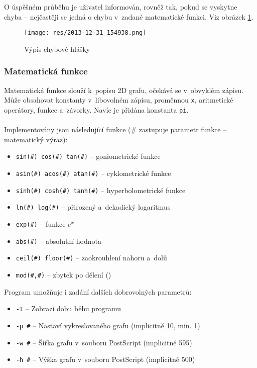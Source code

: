 \documentclass[pdftex,a4paper]{article}
\begin{document}
\newpage

O úspěšném průběhu je uživatel informován, rovněž tak, pokud se vyskytne chyba -- nejčastěji se jedná o chybu v~zadané matematické funkci. Viz obrázek \ref{fig:obr2}. 

\begin{figure}[h]
\texttt{[image: res/2013-12-31\_154938.png]}
\caption{Výpis chybové hlášky}
\label{fig:obr2}
\end{figure}


\subsubsection*{Matematická funkce}
Matematická funkce slouží k~popisu 2D grafu, očekává se v~obvyklém zápisu. Může obsahovat konstanty v~libovolném zápisu, proměnnou \texttt{x}, aritmetické operátory, funkce a~závorky. Navíc je přidána konstanta \texttt{pi}.
\\\\
Implementovány jsou následující funkce (\# zastupuje parametr funkce -- matematický výraz):
\begin{itemize}
\item \texttt{sin(\#) cos(\#) tan(\#)} -- goniometrické funkce
\item \texttt{asin(\#) acos(\#) atan(\#)} -- cyklometrické funkce 
\item \texttt{sinh(\#) cosh(\#) tanh(\#)} -- hyperbolometrické funkce 
\item \texttt{ln(\#) log(\#)} -- přirozený a~dekadický logaritmus
\item \texttt{exp(\#)} -- funkce $e^x$
\item \texttt{abs(\#)} -- absolutní hodnota
\item \texttt{ceil(\#) floor(\#)} -- zaokrouhlení nahoru a~dolů 
\item \texttt{mod(\#,\#)} -- zbytek po dělení () 
\end{itemize}
Program umožňuje i zadání dalších dobrovolných parametrů:
\begin{itemize}
\item \texttt{-t} -- Zobrazí dobu běhu programu
\item \texttt{-p \#} -- Nastaví  vykreslovaného grafu (implicitně 10, min. 1)
\item \texttt{-w \#}  -- Šířka grafu v~souboru \textsf{PostScript} (implicitně 595)
\item \texttt{-h \#}  -- Výška grafu v~souboru \textsf{PostScript} (implicitně 500)
\end{itemize}
\end{document}
